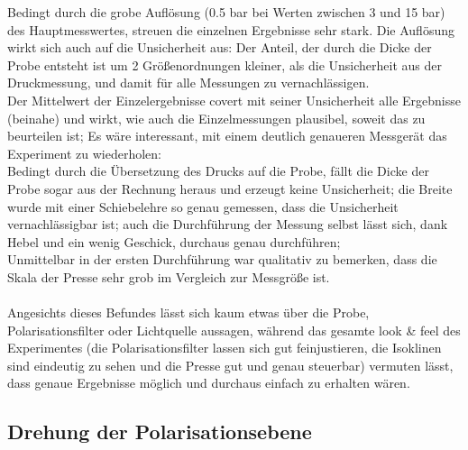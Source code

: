\documentclass[12pt,a4paper]{article}
\begin{document}
\begin{multicols}{2}
Bedingt durch die grobe Auflösung (0.5 bar bei Werten zwischen 3 und 15 bar) des Hauptmesswertes, streuen die einzelnen Ergebnisse sehr stark. Die Auflösung wirkt sich auch auf die Unsicherheit aus: Der Anteil, der durch die Dicke der Probe entsteht ist um 2 Größenordnungen kleiner, als die Unsicherheit aus der Druckmessung, und damit für alle Messungen zu vernachlässigen.\\
Der Mittelwert der Einzelergebnisse covert mit seiner Unsicherheit alle Ergebnisse (beinahe) und wirkt, wie auch die Einzelmessungen plausibel, soweit das zu beurteilen ist; Es wäre interessant, mit einem deutlich genaueren Messgerät das Experiment zu wiederholen:\\
Bedingt durch die Übersetzung des Drucks auf die Probe, fällt die Dicke der Probe sogar aus der Rechnung heraus und erzeugt keine Unsicherheit; die Breite wurde mit einer Schiebelehre so genau gemessen, dass die Unsicherheit vernachlässigbar ist; auch die Durchführung der Messung selbst lässt sich, dank Hebel und ein wenig Geschick, durchaus genau durchführen;\\
Unmittelbar in der ersten Durchführung war qualitativ zu bemerken, dass die Skala der Presse sehr grob im Vergleich zur Messgröße ist.\\
\\
Angesichts dieses Befundes lässt sich kaum etwas über die Probe, Polarisationsfilter oder Lichtquelle aussagen, während das gesamte look \& feel des Experimentes (die Polarisationsfilter lassen sich gut feinjustieren, die Isoklinen sind eindeutig zu sehen und die Presse gut und genau steuerbar) vermuten lässt, dass genaue Ergebnisse möglich und durchaus einfach zu erhalten wären.

\subsection{Drehung der Polarisationsebene}


\end{multicols}
\end{document}

